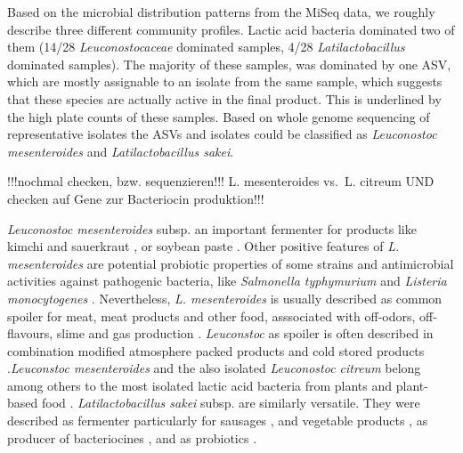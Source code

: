 \documentclass[preprint, 3p,
authoryear]{elsarticle} %
\begin{document}
Based on the microbial distribution patterns from the MiSeq data, we
roughly describe three different community profiles. Lactic acid
bacteria dominated two of them (14/28 \emph{Leuconostocaceae} dominated
samples, 4/28 \emph{Latilactobacillus} dominated samples). The majority
of these samples, was dominated by one ASV, which are mostly assignable
to an isolate from the same sample, which suggests that these species
are actually active in the final product. This is underlined by the high
plate counts of these samples. Based on whole genome sequencing of
representative isolates the ASVs and isolates could be classified as
\emph{Leuconostoc mesenteroides} and \emph{Latilactobacillus sakei}.

!!!nochmal checken, bzw. sequenzieren!!! L. mesenteroides vs.~L. citreum
UND checken auf Gene zur Bacteriocin produktion!!!

\emph{Leuconostoc mesenteroides} subsp. an important fermenter for
products like kimchi and sauerkraut \citep{Chun.2017}, or soybean paste
\citep{Zhang.2019}. Other positive features of \emph{L. mesenteroides}
are potential probiotic properties of some strains and antimicrobial
activities against pathogenic bacteria, like \emph{Salmonella
typhymurium} and \emph{Listeria monocytogenes}
\citep{Paula.2015, Thangavel.2019}. Nevertheless, \emph{L.
mesenteroides} is usually described as common spoiler for meat, meat
products and other food, asssociated with off-odors, off-flavours, slime
and gas production
\citetext{\citealp[\citet{Casaburi.2015}]{Bjorkroth.2006}; \citealp{Lianou.2016}}.
\emph{Leuconstoc} as spoiler is often described in combination modified
atmosphere packed products and cold stored products
\citep{Hamasaki.2003, Hultman.2015, Pothakos.2014}.\emph{Leuconstoc
mesenteroides} and the also isolated \emph{Leuconostoc citreum} belong
among others to the most isolated lactic acid bacteria from plants and
plant-based food \citep{Yu.2020}. \emph{Latilactobacillus sakei} subsp.
are similarly versatile. They were described as fermenter particularly
for sausages \citep{Vinderola.2019}, and vegetable products
\citep{Jung.2014}, as producer of bacteriocines \citep{Castellano.2017},
and as probiotics \citep{Park.2008}.
\end{document}
